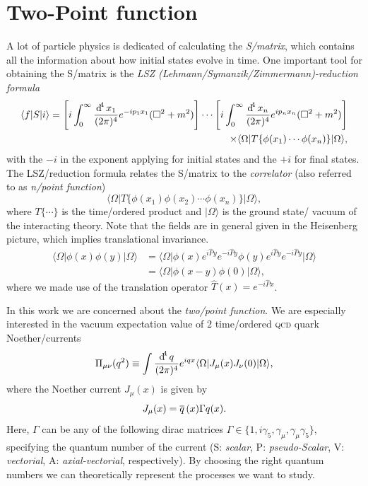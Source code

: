 \documentclass[../../index.tex]{subfiles}
\begin{document}
\section{Two-Point function}
\label{sec:twoPointFunction}
A lot of particle physics is dedicated of calculating the \textit{S\-/matrix}, which
contains all the information about how initial states evolve in time. One
important tool for obtaining the S\-/matrix is the \textit{LSZ (Lehmann\-/Symanzik\-/Zimmermann)-reduction
  formula} \cite{Lehmann1954a,Schwartz2013}
\begin{equation}
  \begin{split}
    \langle f\vert S \vert i\rangle =
    \left[ i\int_0^\infty \fdif{x_1} e^{-ip_1x_1} (\Box^2 + m^2)\right] \cdots
    \left[ i\int_0^\infty \fdif{x_n} e^{ip_nx_n} (\Box^2 + m^2)\right] \\
    \times \langle\Omega\vert T\{\phi(x_1)\cdots\phi(x_n)\} \vert\Omega\rangle,
  \end{split}
\end{equation}
with the $-i$ in the exponent applying for initial states and the $+i$ for final
states. The LSZ\-/reduction formula relates the S\-/matrix to the \textit{correlator} (also referred to as
\textit{n\-/point function})
\begin{equation}
  \langle\Omega\vert T\{\phi(x_1)\phi(x_2)\cdots\phi(x_n)\} \vert\Omega\rangle,
\end{equation}
where $T\{\cdots\}$ is the time\-/ordered product and $\vert\Omega\rangle$
is the ground state/ vacuum of the interacting theory. Note that the fields are in
general given in the Heisenberg picture, which implies translational invariance.
\begin{equation}
  \begin{split}
    \langle\Omega\vert \phi(x)\phi(y) \vert\Omega\rangle &= \langle\Omega\vert \phi(x) e^{i\hat P y}e^{-i\hat P y}\phi(y)e^{i\hat P y}e^{-i\hat P y} \vert\Omega\rangle \\
    &= \langle\Omega\vert \phi(x-y)\phi(0) \vert\Omega\rangle,
  \end{split}
\end{equation}
where we made use of the translation operator $\hat T(x) = e^{-i \hat P x}$.

In this work we are concerned about the \textit{two\-/point function}.
We are especially interested in the vacuum expectation value of $2$ time\-/ordered \textsc{qcd} quark Noether\-/currents
\begin{equation}
  \Pi_{\mu\nu}(q^2) \equiv \int \fdif{q} e^{iqx} \langle\Omega\vert J_\mu(x)J_\nu(0) \vert\Omega\rangle,
\end{equation}
where the Noether current $J_\mu(x)$ is given by
\begin{equation}
  \label{eq:qcdCurrent}
  J_\mu(x) = \overline{q}\,(x) \Gamma q(x).
\end{equation}
Here, $\Gamma$ can be any of the following dirac matrices $\Gamma \in \{ 1,
i\gamma_5, \gamma_\mu, \gamma_\mu\gamma_5\}$, specifying the quantum number of
the current (S: \textit{scalar}, P: \textit{pseudo-Scalar}, V:
\textit{vectorial}, A: \textit{axial-vectorial}, respectively). By choosing the
right quantum numbers we can theoretically represent the processes we want to
study.
\end{document}
